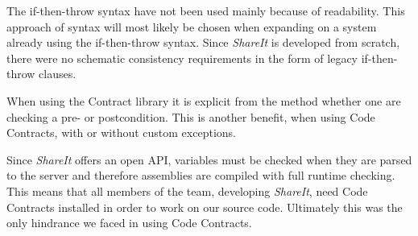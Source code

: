 \documentclass[../report.tex]{subfiles}
\begin{document}
The if-then-throw syntax have not been used mainly because of readability. This approach of syntax will most likely be chosen when expanding on a system already using the if-then-throw syntax. Since \textit{ShareIt} is developed from scratch, there were no schematic consistency requirements in the form of legacy if-then-throw clauses.

When using the Contract library it is explicit from the method whether one are checking a pre- or postcondition. This is another benefit, when using Code Contracts, with or without custom exceptions.

Since \textit{ShareIt} offers an open API, variables must be checked when they are parsed to the server and therefore assemblies are compiled with full runtime checking. This means that all members of the team, developing \textit{ShareIt}, need Code Contracts installed in order to work on our source code. Ultimately this was the only hindrance we faced in using Code Contracts.






\end{document}
